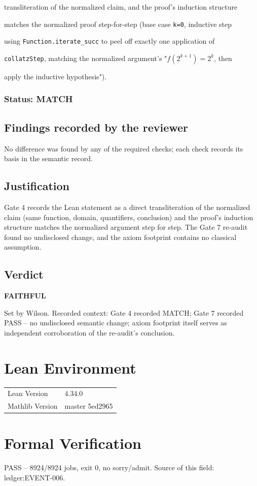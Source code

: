 \documentclass[11pt]{article}
\begin{document}
transliteration of the normalized claim, and the proof's induction structure

matches the normalized proof step-for-step (base case \texttt{k=0}, inductive step

using \texttt{Function.iterate\_succ} to peel off exactly one application of

\texttt{collatzStep}, matching the normalized argument's "$f(2^{k+1})=2^k$, then

apply the inductive hypothesis").

\subsubsection*{Status: MATCH}

\subsection*{Findings recorded by the reviewer}
No difference was found by any of the required checks; each check records its basis in the semantic record.
\subsection*{Justification}
Gate 4 records the Lean statement as a direct transliteration of the normalized claim (same function, domain, quantifiers, conclusion) and the proof's induction structure matches the normalized argument step for step. The Gate 7 re-audit found no undisclosed change, and the axiom footprint contains no classical assumption.


\subsection*{Verdict}
\noindent\textbf{FAITHFUL}\par Set by Wilson. Recorded context: Gate 4 recorded MATCH; Gate 7 recorded PASS -- no undisclosed semantic change; axiom footprint itself serves as independent corroboration of the re-audit's conclusion.
\section{Lean Environment}
\begin{tabular}{@{}ll@{}}
\toprule
Lean Version & 4.34.0 \\
Mathlib Version & master 5ed2965 \\
\bottomrule
\end{tabular}
\section{Formal Verification}
PASS -- 8924/8924 jobs, exit 0, no sorry/admit.
Source of this field: ledger:EVENT-006.
\end{document}
